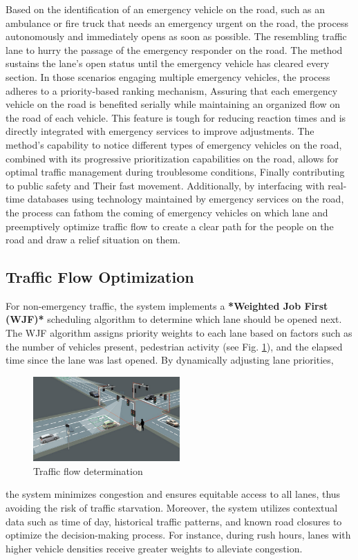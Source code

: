 \documentclass[conference]{IEEEtran}
\begin{document}
Based on the identification of an emergency vehicle on the road, such as an ambulance or fire truck that needs an emergency urgent on the road, the process autonomously and immediately opens as soon as possible. The resembling traffic lane to hurry the passage of the emergency responder on the road. The method sustains the lane’s open status until the emergency vehicle has cleared every section. In those scenarios engaging multiple emergency vehicles, the process adheres to a priority-based ranking mechanism,
Assuring that each emergency vehicle on the road is benefited serially while maintaining an organized flow on the road of each vehicle. This feature is tough for reducing reaction times and is directly integrated with emergency services to improve adjustments. The method’s capability to notice different types of emergency vehicles on the road, combined with its progressive prioritization capabilities on the road, allows for optimal traffic management during troublesome conditions, Finally contributing to public safety and Their fast movement.  Additionally, by interfacing with real-time databases using technology maintained by emergency services on the road, the process can fathom the coming of emergency vehicles on which lane and preemptively optimize traffic flow to create a clear path for the people on the road and draw a relief situation on them.

\subsection{Traffic Flow Optimization}
For non-emergency traffic, the system implements a 
\textbf{*Weighted Job First (WJF)*} scheduling algorithm to determine which lane should be opened next. The WJF algorithm assigns priority weights to each lane based on factors such as the number of vehicles present, pedestrian activity (see Fig. \ref{fig:f3}), and the elapsed time since the lane was last opened. By dynamically adjusting lane priorities,
\begin{figure}[H]
    \centering
    \includegraphics[width=0.5\textwidth]{2_.jpg}
    \caption{Traffic flow determination} %
    \label{fig:f3} %
\end{figure}
the system minimizes congestion and ensures equitable access to all lanes, thus avoiding the risk of traffic starvation. Moreover, the system utilizes contextual data such as time of day, historical traffic patterns, and known road closures to optimize the decision-making process. For instance, during rush hours, lanes with higher vehicle densities receive greater weights to alleviate congestion. 
\end{document}
